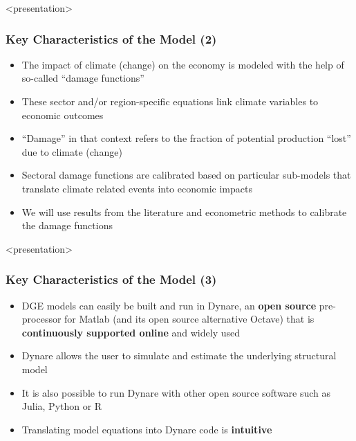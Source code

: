 \documentclass[11pt,aspectratio=169]{beamer}
\begin{document}
   \begin{frame}<presentation>
   	\frametitle{Key Characteristics of the Model (2)}
   	  	\begin{itemize}
   		
   		\item The impact of climate (change) on the economy is modeled with the help of so-called ``damage functions''
   		\item These sector and/or region-specific equations link climate variables to economic outcomes 
			\item ``Damage'' in that context refers to the fraction of potential production ``lost'' due to climate (change)  
   		\item Sectoral damage functions are calibrated based on particular sub-models that translate climate related events into economic impacts
   		\item We will use results from the literature and econometric methods to calibrate the damage functions
   	\end{itemize}
   \end{frame}

   
\begin{frame}<presentation>
	\frametitle{Key Characteristics of the Model (3)}
	\begin{itemize}
		\item DGE models can easily be built and run in Dynare, an \textbf{open source} pre-processor for Matlab (and its open source alternative Octave) that is \textbf{continuously supported online} and widely used
\item	Dynare allows the user to simulate and estimate the underlying structural model
\item It is also possible to run Dynare with other open source software such as Julia, Python or R
\item Translating model equations into Dynare code is \textbf{intuitive}  
\end{itemize}

   		

\end{frame}
\end{document}
